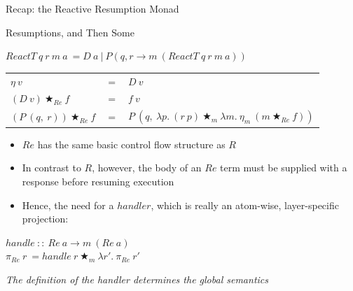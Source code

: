 \documentclass{beamer}
\begin{document}
\begin{frame}{Recap: the Reactive Resumption Monad}

\begin{structure}{Resumptions, and Then Some}
\begin{onlinebox}{11cm}

$ReactT\ q\ r\ m\ a\ = D\ a\ |\ P(q, r \rightarrow m\ (ReactT\ q\ r\ m\ a))$\\

\begin{tabular}[t]{lll}
\\
$\eta\ v$ &$=$& $D\ v$\\
$(D\ v)\ \bigstar_{Re}\ f$ &$=$& $f\ v$\\
$(P\ (q,\ r))\ \bigstar_{Re}\ f$ &$=$& $P\ (q,\ \lambda p .\ (r\ p)\ \bigstar_m\ \lambda m .\ \eta_m\ (m\ \bigstar_{Re}\ f))$\\

\end{tabular}

\end{onlinebox}
\end{structure}

\medskip

\begin{itemize}

\item{$Re$ has the same basic control flow structure as $R$}

\item{In contrast to $R$, however, the body of an $Re$ term must be supplied with a response before resuming execution}

\item{Hence, the need for a $handler$, which is really an atom-wise, layer-specific projection:}

\end{itemize}

\begin{onlinebox}{10cm}

$handle\ ::\ Re\ a \rightarrow m\ (Re\ a)$\\
$\pi_{Re}\ r\ = handle\ r\ \bigstar_m\ \lambda r\prime .\ \pi_{Re}\ r\prime$\\

\end{onlinebox}

\smallskip

\emph{The definition of  the handler determines the global semantics}

\end{frame}
\end{document}
